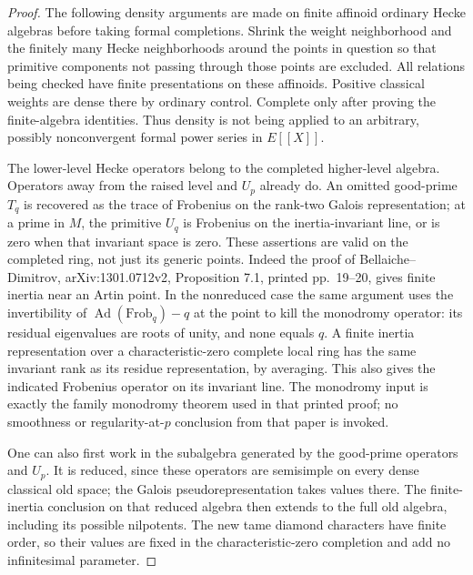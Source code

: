 \begin{proof}
The following density arguments are made on finite affinoid
ordinary Hecke algebras before taking formal completions.  Shrink
the weight neighborhood and the finitely many Hecke neighborhoods
around the points in question so that primitive components not
passing through those points are excluded.  All relations being
checked have finite presentations on these affinoids.  Positive
classical weights are dense there by ordinary control.  Complete
only after proving the finite-algebra identities.  Thus density
is not being applied to an arbitrary, possibly nonconvergent
formal power series in \(E[[X]]\).

The lower-level Hecke operators belong to the completed
higher-level algebra.  Operators away from the raised level and
\(U_p\) already do.  An omitted good-prime \(T_q\) is recovered
as the trace of Frobenius on the rank-two Galois representation;
at a prime in \(M\), the primitive \(U_q\) is Frobenius on the
inertia-invariant line, or is zero when that invariant space is
zero.  These assertions are valid on the completed ring, not just
its generic points.  Indeed the proof of Bellaiche--Dimitrov,
arXiv:1301.0712v2, Proposition 7.1, printed pp.~19--20, gives
finite inertia near an Artin point.  In the nonreduced case the
same argument uses the invertibility of
\(\operatorname{Ad}(\mathrm{Frob}_q)-q\) at the point to kill
the monodromy operator: its residual eigenvalues are roots of
unity, and none equals \(q\).  A finite inertia representation
over a characteristic-zero complete local ring has the same
invariant rank as its residue representation, by averaging.
This also gives the indicated Frobenius operator on its invariant
line.  The monodromy input is exactly the family monodromy theorem
used in that printed proof; no smoothness or regularity-at-\(p\)
conclusion from that paper is invoked.

One can also first work in the subalgebra generated by the
good-prime operators and \(U_p\).  It is reduced, since these
operators are semisimple on every dense classical old space;
the Galois pseudorepresentation takes values there.  The
finite-inertia conclusion on that reduced algebra then extends
to the full old algebra, including its possible nilpotents.
The new tame diamond characters have finite order, so their
values are fixed in the characteristic-zero completion and
add no infinitesimal parameter.


\end{proof}
